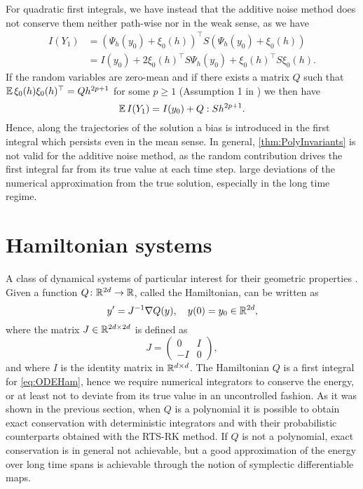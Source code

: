 \documentclass[10pt]{article}
\begin{document}
For quadratic first integrals, we have instead that the additive noise method does not conserve them neither path-wise nor in the weak sense, as we have
\begin{equation}
\begin{aligned}
	I(Y_1) &= (\Psi_h(y_0) + \xi_0(h))^\top  S (\Psi_h(y_0) + \xi_0(h)) \\
	&= I(y_0) + 2\xi_0(h)^\top  S  \Psi_h(y_0) + \xi_0(h)^\top  S \xi_0(h).
\end{aligned}
\end{equation}
If the random variables are zero-mean and if there exists a matrix $Q$ such that $\operatorname{\mathbb{E}}\xi_0(h)\xi_0(h)^\top  = Qh^{2p + 1}$ for some $p \geq 1$ (Assumption 1 in \cite{CGS17}) we then have
\begin{equation}\label{eq:BiasQuadraticAddNoise}
\operatorname{\mathbb{E}} I(Y_1) = I(y_0) + Q : S h^{2p + 1}.
\end{equation}
Hence, along the trajectories of the solution a bias is introduced in the first integral which persists even in the mean sense. In general, \cref{thm:PolyInvariants} is not valid for the additive noise method, as the random contribution drives the first integral far from its true value at each time step.  large deviations of the numerical approximation from the true solution, especially in the long time regime.

\section{Hamiltonian systems}\label{sec:Hamiltonian} A class of dynamical systems of particular interest for their geometric properties . Given a function $Q \colon \mathbb{R}^{2d} \to \mathbb{R}$, called the Hamiltonian,  can be written as
\begin{equation}\label{eq:ODEHam}
y' = J^{-1}\nabla Q(y), \quad y(0) = y_0 \in \mathbb{R}^{2d},
\end{equation}
where the matrix $J\in\mathbb{R}^{2d \times 2d}$ is defined as
\begin{equation}
J = \begin{pmatrix} 0 & I \\ -I & 0 \end{pmatrix},
\end{equation}
and where $I$ is the identity matrix in $\mathbb{R}^{d\times d}$. The Hamiltonian $Q$ is a first integral for \eqref{eq:ODEHam}, hence we require numerical integrators to conserve the energy, or at least not to deviate from its true value in an uncontrolled fashion. As it was shown in the previous section, when $Q$ is a polynomial it is possible to obtain exact conservation with deterministic integrators and with their probabilistic counterparts obtained with the RTS-RK method. If $Q$ is not a polynomial, exact conservation is in general not achievable, but a good approximation of the energy over long time spans is achievable through the notion of symplectic differentiable maps.
\end{document}
